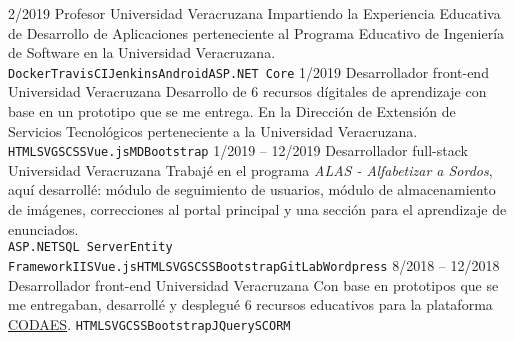 \documentclass[9pt]{developercv} %
\begin{document}
\begin{entrylist}
    \entry
		{2/2019}
		{Profesor}
		{Universidad Veracruzana}
        {Impartiendo la Experiencia Educativa de Desarrollo de Aplicaciones perteneciente al Programa Educativo de Ingeniería de Software en la Universidad Veracruzana.\\
        \texttt{Docker}\slashsep\texttt{TravisCI}\slashsep\texttt{Jenkins}\slashsep\texttt{Android}\slashsep\texttt{ASP.NET Core}}
	\entry
		{1/2019}
		{Desarrollador front-end}
		{Universidad Veracruzana}
        {Desarrollo de 6 recursos dígitales de aprendizaje con base en un prototipo que se me entrega. En la Dirección de Extensión de Servicios Tecnológicos perteneciente a la Universidad Veracruzana.
        \texttt{HTML}\slashsep\texttt{SVG}\slashsep\texttt{SCSS}\slashsep\texttt{Vue.js}\slashsep\texttt{MDBootstrap}}
	\entry
		{1/2019 -- 12/2019}
		{Desarrollador full-stack}
		{Universidad Veracruzana}
        {Trabajé en el programa \textit{ALAS - Alfabetizar a Sordos}, aquí desarrollé: módulo de seguimiento de usuarios, módulo de almacenamiento de imágenes, correcciones al portal principal y una sección para el aprendizaje de enunciados. \\
        \texttt{ASP.NET}\slashsep\texttt{SQL Server}\slashsep\texttt{Entity Framework}\slashsep\texttt{IIS}\slashsep\texttt{Vue.js}\slashsep\texttt{HTML}\slashsep\texttt{SVG}\slashsep\texttt{SCSS}\slashsep\texttt{Bootstrap}\slashsep\texttt{GitLab}\slashsep\texttt{Wordpress}}
	\entry
		{8/2018 -- 12/2018}
		{Desarrollador front-end}
		{Universidad Veracruzana}
        {Con base en prototipos que se me entregaban, desarrollé y desplegué 6 recursos educativos para la plataforma \href{https://www.codaes.mx}{CODAES}.
        \texttt{HTML}\slashsep\texttt{SVG}\slashsep\texttt{CSS}\slashsep\texttt{Bootstrap}\slashsep\texttt{JQuery}\slashsep\texttt{SCORM}}
\end{entrylist}



	
	
\end{document}
